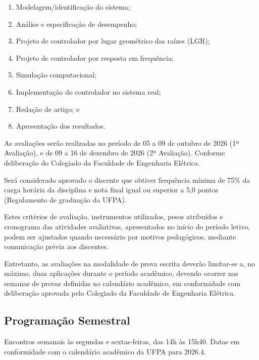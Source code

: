 \documentclass[oneside,a4paper,12pt]{article}
\begin{document}
\begin{enumerate}
    \item Modelagem/identificação do sistema;
    \item Análise e especificação de desempenho;
    \item Projeto de controlador por lugar geométrico das raízes (LGR);
    \item Projeto de controlador por resposta em frequência;
    \item Simulação computacional;
    \item Implementação do controlador no sistema real;
    \item Redação de artigo; e
    \item Apresentação dos resultados.
\end{enumerate}

As avaliações serão realizadas no período de 05 a 09 de outubro de 2026 (1ª Avaliação), e de 09 a 16 de dezembro de 2026 (2ª Avaliação). Conforme deliberação do Colegiado da Faculdade de Engenharia Elétrica.

Será considerado aprovado o discente que obtiver frequência mínima de 75\% da carga horária da disciplina e nota final igual ou superior a 5,0 pontos (Regulamento de graduação da UFPA).

Estes critérios de avaliação, instrumentos utilizados, pesos atribuídos e cronograma das atividades avaliativas, apresentados no início do período letivo, podem ser ajustados quando necessário por motivos pedagógicos, mediante comunicação prévia aos discentes.

Entretanto, as avaliações na modalidade de prova escrita deverão limitar-se a, no máximo, duas aplicações durante o período acadêmico, devendo ocorrer nas semanas de provas definidas no calendário acadêmico, em conformidade com deliberação aprovada pelo Colegiado da Faculdade de Engenharia Elétrica.

  \begin{snugshade}
  \section*{Programação Semestral} %
  \end{snugshade}

Encontros semanais às segundas e sextas-feiras, das 14h às 15h40. Datas em conformidade com o calendário acadêmico da UFPA para 2026.4.
\end{document}
